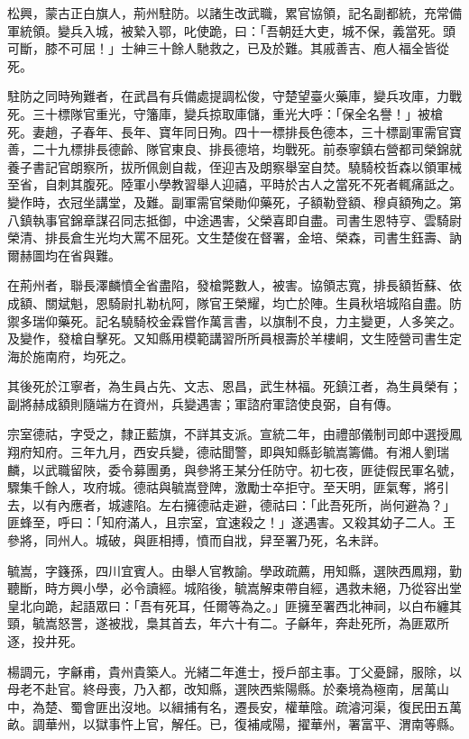 \begin{pinyinscope}
松興，蒙古正白旗人，荊州駐防。以諸生改武職，累官協領，記名副都統，充常備軍統領。變兵入城，被縶入鄂，叱使跪，曰：「吾朝廷大吏，城不保，義當死。頭可斷，膝不可屈！」士紳三十餘人馳救之，已及於難。其戚善吉、庖人福全皆從死。

駐防之同時殉難者，在武昌有兵備處提調松俊，守楚望臺火藥庫，變兵攻庫，力戰死。三十標隊官重光，守籓庫，變兵掠取庫儲，重光大呼：「保全名譽！」被槍死。妻趙，子春年、長年、寶年同日殉。四十一標排長色德本，三十標副軍需官寶善，二十九標排長德齡、隊官東良、排長德培，均戰死。前泰寧鎮右營都司榮錦就養子書記官朗察所，拔所佩劍自裁，侄迎吉及朗察舉室自焚。驍騎校哲森以領軍械至省，自刺其腹死。陸軍小學教習舉人迎禧，平時於古人之當死不死者輒痛詆之。變作時，衣冠坐講堂，及難。副軍需官榮勛仰藥死，子額勒登額、穆貞額殉之。第八鎮執事官錦章謀召同志抵御，中途遇害，父榮喜即自盡。司書生恩特亨、雲騎尉榮清、排長倉生光均大罵不屈死。文生楚俊在督署，金培、榮森，司書生鈺壽、訥爾赫圖均在省與難。

在荊州者，聯長澤麟憤全省盡陷，發槍斃數人，被害。協領志寬，排長額哲蘇、依成額、關斌魁，恩騎尉扎勒杭阿，隊官王榮耀，均亡於陣。生員秋培城陷自盡。防禦多瑞仰藥死。記名驍騎校金霖嘗作萬言書，以旗制不良，力主變更，人多笑之。及變作，發槍自擊死。又知縣用模範講習所所員根壽於羊樓峒，文生陸營司書生定海於施南府，均死之。

其後死於江寧者，為生員占先、文志、恩昌，武生林福。死鎮江者，為生員榮有；副將赫成額則隨端方在資州，兵變遇害；軍諮府軍諮使良弼，自有傳。

宗室德祜，字受之，隸正藍旗，不詳其支派。宣統二年，由禮部儀制司郎中選授鳳翔府知府。三年九月，西安兵變，德祜聞警，即與知縣彭毓嵩籌備。有湘人劉瑞麟，以武職留陜，委令募團勇，與參將王某分任防守。初七夜，匪徒假民軍名號，驟集千餘人，攻府城。德祜與毓嵩登陴，激勵士卒拒守。至天明，匪氣奪，將引去，以有內應者，城遽陷。左右擁德祜走避，德祜曰：「此吾死所，尚何避為？」匪蜂至，呼曰：「知府滿人，且宗室，宜速殺之！」遂遇害。又殺其幼子二人。王參將，同州人。城破，與匪相搏，憤而自戕，舁至署乃死，名未詳。

毓嵩，字籛孫，四川宜賓人。由舉人官教諭。學政疏薦，用知縣，選陜西鳳翔，勤聽斷，時方興小學，必令讀經。城陷後，毓嵩解束帶自經，遇救未絕，乃從容出堂皇北向跪，起語眾曰：「吾有死耳，任爾等為之。」匪擁至署西北神祠，以白布纏其頸，毓嵩怒詈，遂被戕，梟其首去，年六十有二。子龢年，奔赴死所，為匪眾所逐，投井死。

楊調元，字龢甫，貴州貴築人。光緒二年進士，授戶部主事。丁父憂歸，服除，以母老不赴官。終母喪，乃入都，改知縣，選陜西紫陽縣。於秦境為極南，居萬山中，為楚、蜀會匪出沒地。以緝捕有名，遷長安，權華陰。疏濬河渠，復民田五萬畝。調華州，以獄事忤上官，解任。已，復補咸陽，擢華州，署富平、渭南等縣。


\end{pinyinscope}
